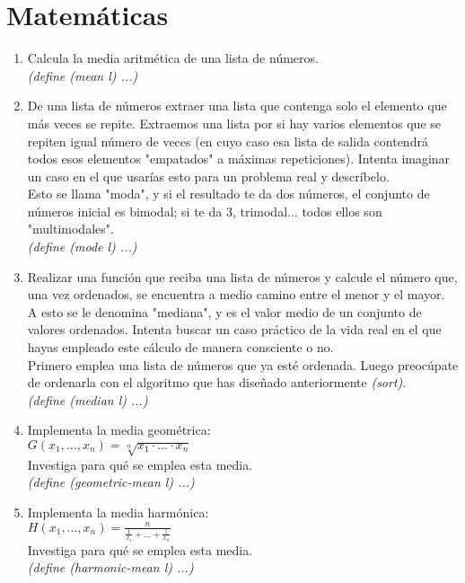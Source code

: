 \documentclass[11pt]{article}
\begin{document}
\begin{enumerate}
\end{enumerate}

\section{Matemáticas}
\begin{enumerate}
  \item Calcula la media aritmética de una lista de números.
    \\[3mm]
    \textit{(define (mean l) ...)}

  \item De una lista de números extraer una lista que contenga solo el elemento que más veces se repite. Extraemos una lista por si hay varios elementos que se repiten igual número de veces (en cuyo caso esa lista de salida contendrá todos esos elementos "empatados" a máximas repeticiones).
    Intenta imaginar un caso en el que usarías esto para un problema real y descríbelo.
    \\[3mm]
    Esto se llama "moda", y si el resultado te da dos números, el conjunto de números inicial es bimodal; si te da 3, trimodal... todos ellos son "multimodales".
    \\[3mm]
    \textit{(define (mode l) ...)}

  \item Realizar una función que reciba una lista de números y calcule el número que, una vez ordenados, se encuentra a medio camino entre el menor y el mayor.
    \\[3mm]
    A esto se le denomina "mediana", y es el valor medio de un conjunto de valores ordenados. Intenta buscar un caso práctico de la vida real en el que hayas empleado este cálculo de manera consciente o no.
    \\[3mm]
    Primero emplea una lista de números que ya esté ordenada. Luego preocúpate de ordenarla con el algoritmo que has diseñado anteriormente \textit{(sort)}.
    \\[3mm]
    \textit{(define (median l) ...)}

  \item Implementa la media geométrica:
    \\[3mm]
    {\Large
    $G(x_1,\dots,x_n) = \sqrt[n]{x_1 \cdot \dots \cdot x_n}$
  }
    \\[3mm]
    Investiga para qué se emplea esta media.
    \\[3mm]
    \textit{(define (geometric-mean l) ...)}

  \item Implementa la media harmónica:
    \\[3mm]
    {\Large
    $H(x_1,\dots,x_n) = \frac{n}{\frac{1}{x_1} + \dots + \frac{1}{x_n}}$
  }
    \\[3mm]
    Investiga para qué se emplea esta media.
    \\[3mm]
    \textit{(define (harmonic-mean l) ...)}


\end{enumerate}
\end{document}
